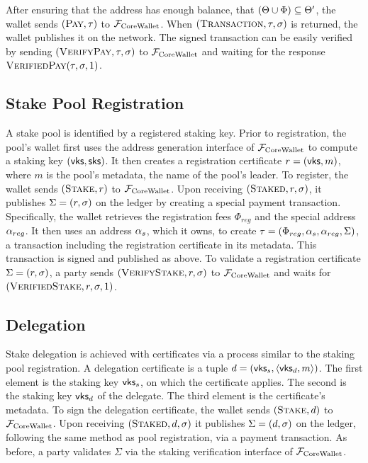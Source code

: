 After ensuring that the address has enough balance, \ie that $(\Theta \cup
\Phi) \subseteq \Theta^\prime$, the wallet sends $(\textsc{Pay}, \tau)$ to
$\mathcal{F}_\mathrm{CoreWallet}$. When $(\textsc{Transaction}, \tau, \sigma)$ is returned, the wallet
publishes it on the network. The signed transaction can be easily verified by
sending $(\textsc{VerifyPay}, \tau, \sigma)$ to $\mathcal{F}_\mathrm{CoreWallet}$ and waiting for the
response $\textsc{VerifiedPay}(\tau, \sigma, 1)$.

\subsection{Stake Pool Registration}

A stake pool is identified by a registered staking key. Prior to registration,
the pool's wallet first uses the address generation interface of $\mathcal{F}_\mathrm{CoreWallet}$ to
compute a staking key $(\mathsf{vks}, \mathsf{sks})$. It then creates a registration
certificate $r = (\mathsf{vks}, m)$, where $m$ is the pool's metadata, \eg
the name of the pool's leader. To register, the wallet sends $(\textsc{Stake},
r)$ to $\mathcal{F}_\mathrm{CoreWallet}$. Upon receiving $(\textsc{Staked}, r, \sigma)$, it publishes
$\Sigma = (r, \sigma)$ on the ledger by creating a special payment transaction.
Specifically, the wallet retrieves the registration fees $\Phi_{reg}$ and the
special address $\alpha_{reg}$. It then uses an address $\alpha_s$, which it
owns, to create  $\tau = (\Phi_{reg}, \alpha_s, \alpha_{reg}, \Sigma)$, \ie a
transaction including the registration certificate in its metadata. This
transaction is signed and published as above.  To validate a registration
certificate $\Sigma = (r, \sigma)$, a party sends $(\textsc{VerifyStake}, r,
\sigma)$ to $\mathcal{F}_\mathrm{CoreWallet}$ and waits for $(\textsc{VerifiedStake}, r, \sigma, 1)$.

\subsection{Delegation}\label{subsec:delegation}

Stake delegation is achieved with certificates via a process similar to the
staking pool registration. A delegation certificate is a tuple $d =
(\mathsf{vks}_s, \langle \mathsf{vks}_d, m \rangle )$. The first
element is the staking key $\mathsf{vks}_{s}$, on which the certificate
applies. The second is the staking key $\mathsf{vks}_d$ of the delegate.
The third element is the certificate's metadata. To sign the delegation
certificate, the wallet sends $(\textsc{Stake}, d)$ to $\mathcal{F}_\mathrm{CoreWallet}$. Upon receiving
$(\textsc{Staked}, d, \sigma)$ it publishes $\Sigma = (d, \sigma)$ on the ledger,
following the same method as pool registration, \ie via a payment transaction.
As before, a party validates $\Sigma$ via the staking verification interface of
$\mathcal{F}_\mathrm{CoreWallet}$.

